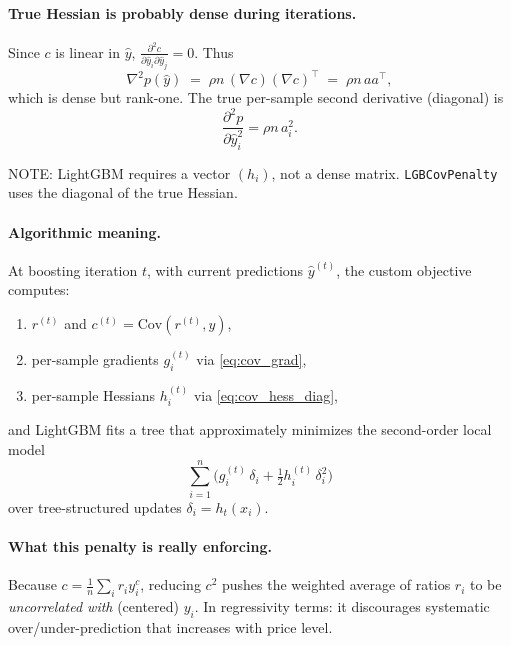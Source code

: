 \documentclass[11pt]{article}
\theoremstyle{plain}
\theoremstyle{definition}
\newcommand{\1}{\mathbf{1}}
\begin{document}
\paragraph{True Hessian is probably dense during iterations.}
Since $c$ is linear in $\hat y$, $\frac{\partial^2 c}{\partial \hat y_i \partial \hat y_j}=0$. Thus
\[
\nabla^2 p(\hat y)
\;=\;
\rho n \,(\nabla c)(\nabla c)^\top
\;=\;
\rho n \, a a^\top,
\]
which is dense but rank-one. The true per-sample second derivative (diagonal) is
\[
\frac{\partial^2 p}{\partial \hat y_i^2}
=
\rho n\,a_i^2.
\]


{\color{red} NOTE: LightGBM requires a vector $(h_i)$, not a dense matrix. \texttt{LGBCovPenalty} uses the diagonal of the true Hessian.}

\paragraph{Algorithmic meaning.}
At boosting iteration $t$, with current predictions $\hat y^{(t)}$, the custom objective computes:
\begin{enumerate}
  \item $r^{(t)}$ and $c^{(t)}=\mathrm{Cov}(r^{(t)},y)$,
  \item per-sample gradients $g_i^{(t)}$ via \eqref{eq:cov_grad},
  \item per-sample Hessians $h_i^{(t)}$ via \eqref{eq:cov_hess_diag},
\end{enumerate}
and LightGBM fits a tree that approximately minimizes the second-order local model
\[
\sum_{i=1}^n \Big(g_i^{(t)}\,\delta_i + \tfrac{1}{2}h_i^{(t)}\,\delta_i^2\Big)
\]
over tree-structured updates $\delta_i = h_t(x_i)$.

\paragraph{What this penalty is really enforcing.}
Because $c=\frac{1}{n}\sum_i r_i y_i^c$, reducing $c^2$ pushes the weighted average of ratios $r_i$ to be \emph{uncorrelated with} (centered) $y_i$. In regressivity terms: it discourages systematic over/under-prediction that increases with price level.
\end{document}
